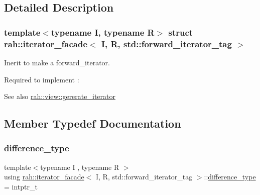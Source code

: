 \subsection{Detailed Description}
\subsubsection*{template$<$typename I, typename R$>$\newline
struct rah\+::iterator\+\_\+facade$<$ I, R, std\+::forward\+\_\+iterator\+\_\+tag $>$}

Inerit to make a forward\+\_\+iterator. 

Required to implement \+: 
\begin{DoxyCode}{0}
\end{DoxyCode}
 \begin{DoxySeeAlso}{See also}
\mbox{\hyperlink{structrah_1_1view_1_1gererate__iterator}{rah\+::view\+::gererate\+\_\+iterator}} 
\end{DoxySeeAlso}


\subsection{Member Typedef Documentation}
\mbox{\label{structrah_1_1iterator__facade_3_01_i_00_01_r_00_01std_1_1forward__iterator__tag_01_4_a9f8ec957ea36b46eae3ca8bb89b6cf1c}} 
\subsubsection{\texorpdfstring{difference\_type}{difference\_type}}
{\footnotesize\ttfamily template$<$typename I , typename R $>$ \\
using \mbox{\hyperlink{structrah_1_1iterator__facade}{rah\+::iterator\+\_\+facade}}$<$ I, R, std\+::forward\+\_\+iterator\+\_\+tag $>$\+::\mbox{\hyperlink{structrah_1_1iterator__facade_3_01_i_00_01_r_00_01std_1_1forward__iterator__tag_01_4_a9f8ec957ea36b46eae3ca8bb89b6cf1c}{difference\+\_\+type}} =  intptr\+\_\+t}

